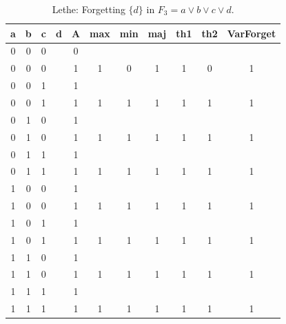 \begin{table}[!tb]
    \centering
    \begin{tabular}{|c|c|c|c|c|c|c|c|c|c|c|}
        \hline
        \textbf{a} & \textbf{b} & \textbf{c} & \textbf{d} & \textbf{A} & \textbf{max} & \textbf{min} & \textbf{maj} & \textbf{th1} & \textbf{th2} & \textbf{VarForget} \\ \hline
        \rowcolor{gray!40} 0 & 0 & 0 &  & 0 &  &  &  &  &  &  \\ \hline
        \rowcolor{gray!40} 0 & 0 & 0 &  & 1 & 1 & 0 & 1 & 1 & 0 & 1 \\ \hline
        \rowcolor{blue!40} 0 & 0 & 1 &  & 1 &  &  &  &  &  &  \\ \hline
        \rowcolor{blue!40} 0 & 0 & 1 &  & 1 & 1 & 1 & 1 & 1 & 1 & 1 \\ \hline
        \rowcolor{red!40} 0 & 1 & 0 &  & 1 &  &  &  &  &  &  \\ \hline
        \rowcolor{red!40} 0 & 1 & 0 &  & 1 & 1 & 1 & 1 & 1 & 1 & 1 \\ \hline
        \rowcolor{green!40} 0 & 1 & 1 &  & 1 &  &  &  &  &  &  \\ \hline
        \rowcolor{green!40} 0 & 1 & 1 &  & 1 & 1 & 1 & 1 & 1 & 1 & 1 \\ \hline
        \rowcolor{yellow!40} 1 & 0 & 0 &  & 1 &  &  &  &  &  &  \\ \hline
        \rowcolor{yellow!40} 1 & 0 & 0 &  & 1 & 1 & 1 & 1 & 1 & 1 & 1 \\ \hline
        \rowcolor{gray!40} 1 & 0 & 1 &  & 1 &  &  &  &  &  &  \\ \hline
        \rowcolor{gray!40} 1 & 0 & 1 &  & 1 & 1 & 1 & 1 & 1 & 1 & 1 \\ \hline
        \rowcolor{blue!40} 1 & 1 & 0 &  & 1 &  &  &  &  &  &  \\ \hline
        \rowcolor{blue!40} 1 & 1 & 0 &  & 1 & 1 & 1 & 1 & 1 & 1 & 1 \\ \hline
        \rowcolor{red!40} 1 & 1 & 1 &  & 1 &  &  &  &  &  &  \\ \hline
        \rowcolor{red!40} 1 & 1 & 1 &  & 1 & 1 & 1 & 1 & 1 & 1 & 1 \\ \hline
    \end{tabular}
    \caption{Lethe: Forgetting $\{d\}$ in $F_{3} = a \lor b \lor c \lor d$.}
    \label{tab:lethe-F3-d}
\end{table}
